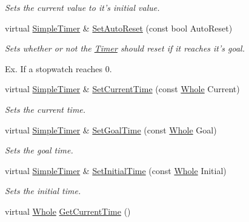 \begin{DoxyCompactItemize}
\begin{DoxyCompactList}\small\item\em Sets the current value to it's initial value. \item\end{DoxyCompactList}\item 
virtual \hyperlink{classphys_1_1SimpleTimer}{SimpleTimer} \& \hyperlink{classphys_1_1SimpleTimer_a5a278c256d292a68ffbb35f8db9cb445}{SetAutoReset} (const bool AutoReset)
\begin{DoxyCompactList}\small\item\em Sets whether or not the \hyperlink{classphys_1_1Timer}{Timer} should reset if it reaches it's goal. \par
 Ex. If a stopwatch reaches 0. \item\end{DoxyCompactList}\item 
virtual \hyperlink{classphys_1_1SimpleTimer}{SimpleTimer} \& \hyperlink{classphys_1_1SimpleTimer_a1c874c4e367d582ab0006e7cdb8be0d5}{SetCurrentTime} (const \hyperlink{namespacephys_a460f6bc24c8dd347b05e0366ae34f34a}{Whole} Current)
\begin{DoxyCompactList}\small\item\em Sets the current time. \item\end{DoxyCompactList}\item 
virtual \hyperlink{classphys_1_1SimpleTimer}{SimpleTimer} \& \hyperlink{classphys_1_1SimpleTimer_a09ad426a36971257d2f800075f562eda}{SetGoalTime} (const \hyperlink{namespacephys_a460f6bc24c8dd347b05e0366ae34f34a}{Whole} Goal)
\begin{DoxyCompactList}\small\item\em Sets the goal time. \item\end{DoxyCompactList}\item 
virtual \hyperlink{classphys_1_1SimpleTimer}{SimpleTimer} \& \hyperlink{classphys_1_1SimpleTimer_a00bf7f837c8ed515a65bd8dbf6d9d593}{SetInitialTime} (const \hyperlink{namespacephys_a460f6bc24c8dd347b05e0366ae34f34a}{Whole} Initial)
\begin{DoxyCompactList}\small\item\em Sets the initial time. \item\end{DoxyCompactList}\item 
virtual \hyperlink{namespacephys_a460f6bc24c8dd347b05e0366ae34f34a}{Whole} \hyperlink{classphys_1_1SimpleTimer_aa0cda0797bfb501240016177ff1450a5}{GetCurrentTime} ()

\end{DoxyCompactItemize}
